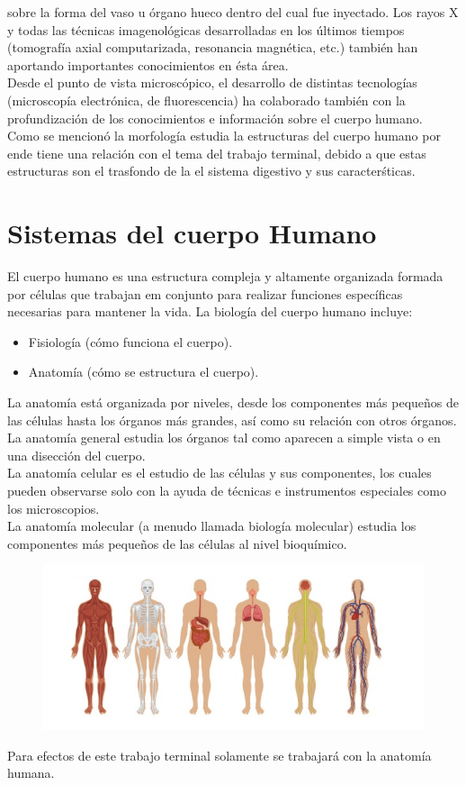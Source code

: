 sobre la forma del vaso u órgano hueco dentro del cual fue inyectado. Los rayos X y todas las técnicas imagenológicas desarrolladas en los últimos tiempos 
(tomografía axial computarizada, resonancia magnética, etc.) también han aportando importantes conocimientos en ésta área.\\
Desde el punto de vista microscópico, el desarrollo de distintas tecnologías (microscopía electrónica, de fluorescencia) ha colaborado también con la profundización de los 
conocimientos e informaci\'on sobre el cuerpo humano.\\
Como se mencionó la morfología estudia la estructuras del cuerpo humano por ende tiene una relación con el tema del trabajo terminal, debido a que estas estructuras son 
el trasfondo de la el sistema digestivo y sus caracter\'sticas.

\section{Sistemas del cuerpo Humano}
El cuerpo humano es una estructura compleja y altamente organizada formada por células que trabajan em conjunto para realizar funciones específicas necesarias 
para mantener la vida.\cite{web17} La biología del cuerpo humano incluye:
\begin{itemize}
	\item Fisiología (cómo funciona el cuerpo).
	\item Anatomía (cómo se estructura el cuerpo).	
\end{itemize}
La anatomía está organizada por niveles, desde los componentes más pequeños de las células hasta los órganos más grandes, así como su relación con otros órganos.\\
La anatomía general estudia los órganos tal como aparecen a simple vista o en una disección del cuerpo.\\
La anatomía celular es el estudio de las células y sus componentes, los cuales pueden observarse solo con la ayuda de técnicas e instrumentos especiales como los microscopios.\\
La anatomía molecular (a menudo llamada biología molecular) estudia los componentes más pequeños de las células al nivel bioquímico.\\
\begin{figure}[H]
\begin{center}
	\includegraphics[width = .7\textwidth]{source/images/image22.png}
	\end{center} 
\end{figure}
Para efectos de este trabajo terminal solamente se trabajará con la anatomía humana.

